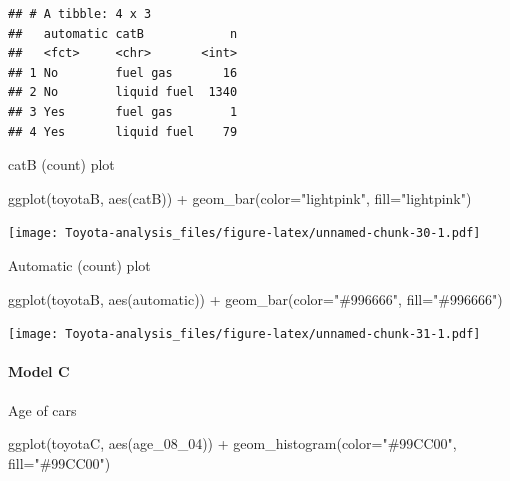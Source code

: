 \documentclass[
]{article}
\newenvironment{Shaded}{\begin{snugshade}}{\end{snugshade}}
\newcommand{\AttributeTok}[1]{\textcolor[rgb]{0.77,0.63,0.00}{#1}}
\newcommand{\FunctionTok}[1]{\textcolor[rgb]{0.00,0.00,0.00}{#1}}
\newcommand{\NormalTok}[1]{#1}
\newcommand{\SpecialCharTok}[1]{\textcolor[rgb]{0.00,0.00,0.00}{#1}}
\newcommand{\StringTok}[1]{\textcolor[rgb]{0.31,0.60,0.02}{#1}}
\begin{document}
\begin{verbatim}
## # A tibble: 4 x 3
##   automatic catB            n
##   <fct>     <chr>       <int>
## 1 No        fuel gas       16
## 2 No        liquid fuel  1340
## 3 Yes       fuel gas        1
## 4 Yes       liquid fuel    79
\end{verbatim}

catB (count) plot

\begin{Shaded}
\begin{Highlighting}[]
\FunctionTok{ggplot}\NormalTok{(toyotaB, }\FunctionTok{aes}\NormalTok{(catB)) }\SpecialCharTok{+} \FunctionTok{geom\_bar}\NormalTok{(}\AttributeTok{color=}\StringTok{"lightpink"}\NormalTok{, }\AttributeTok{fill=}\StringTok{"lightpink"}\NormalTok{) }
\end{Highlighting}
\end{Shaded}

\texttt{[image: Toyota-analysis\_files/figure-latex/unnamed-chunk-30-1.pdf]}

Automatic (count) plot

\begin{Shaded}
\begin{Highlighting}[]
\FunctionTok{ggplot}\NormalTok{(toyotaB, }\FunctionTok{aes}\NormalTok{(automatic)) }\SpecialCharTok{+} \FunctionTok{geom\_bar}\NormalTok{(}\AttributeTok{color=}\StringTok{"\#996666"}\NormalTok{, }\AttributeTok{fill=}\StringTok{"\#996666"}\NormalTok{)}
\end{Highlighting}
\end{Shaded}

\texttt{[image: Toyota-analysis\_files/figure-latex/unnamed-chunk-31-1.pdf]}

\hypertarget{model-c-5}{%
\paragraph{Model C}\label{model-c-5}}

Age of cars

\begin{Shaded}
\begin{Highlighting}[]
\FunctionTok{ggplot}\NormalTok{(toyotaC, }\FunctionTok{aes}\NormalTok{(age\_08\_04)) }\SpecialCharTok{+} \FunctionTok{geom\_histogram}\NormalTok{(}\AttributeTok{color=}\StringTok{"\#99CC00"}\NormalTok{, }\AttributeTok{fill=}\StringTok{"\#99CC00"}\NormalTok{)}
\end{Highlighting}
\end{Shaded}
\end{document}
